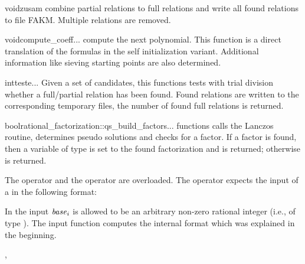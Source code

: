 \begin{Tfcode}{void}{zusam}{}
  combine partial relations to full relations and write all found relations to file FAKM.
  Multiple relations are removed.
\end{Tfcode}

\begin{Tfcode}{void}{compute_coeff}{...}
  compute the next polynomial.  This function is a direct translation of the formulas in the
  self initialization variant.  Additional information like sieving starting points are also
  determined.
\end{Tfcode}

\begin{Tfcode}{int}{teste}{...}
  Given a set of candidates, this functions tests with trial division whether a full/partial
  relation has been found.  Found relations are written to the corresponding temporary files,
  the number of found full relations is returned.
\end{Tfcode}

\begin{Tfcode}{bool}{rational_factorization::qs_build_factors}{...}
  functions calls the Lanczos routine, determines pseudo solutions and checks for a factor.  If
  a factor is found, then a variable of type  is set to the found
  factorization and \FALSE is returned; otherwise \TRUE is returned.
\end{Tfcode}



\IO

The  operator \code{>>} and the  operator \code{<<} are overloaded.
The  operator \code{>>} expects the input of a  in
the following format:
\begin{displaymath}
  [(\base_0,\expt_0)\,(\base_1,\expt_1)\,\dots \,(\base_{l-1},\expt_{l-1})]
\end{displaymath}

In the input $\mathit{base}_i$ is allowed to be an arbitrary non-zero rational integer (i.e., of type
).  The input function computes the internal format which was explained in the
beginning.



\SEEALSO

, 


